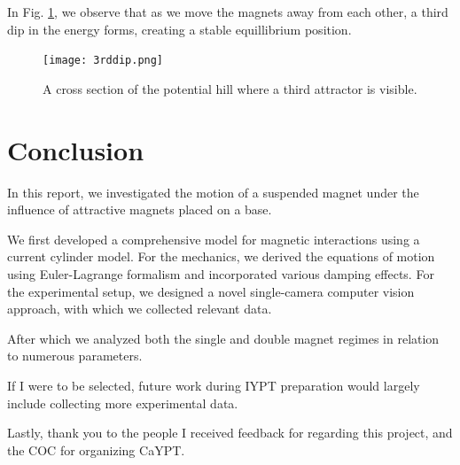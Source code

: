 \documentclass[prl,twocolumn,amsmath,amssymb,superscriptaddress]{revtex4-2}
\begin{document}
\newpage
In Fig. \ref{fig:3rddip}, we observe that as we move the magnets away from each other, a third dip in the energy forms, creating a stable equillibrium position.

\begin{figure}[htb]
    \centering
    \texttt{[image: 3rddip.png]}
    \caption{A cross section of the potential hill where a third attractor is visible.}
    \label{fig:3rddip}
\end{figure}

\section{Conclusion}
In this report, we investigated the motion of a suspended magnet under the influence of attractive magnets placed on a base.

We first developed a comprehensive model for magnetic interactions using a current cylinder model. For the mechanics, we derived the equations of motion using Euler-Lagrange formalism and incorporated various damping effects. For the experimental setup, we designed a novel single-camera computer vision approach, with which we collected relevant data.

After which we analyzed both the single and double magnet regimes in relation to numerous parameters.

If I were to be selected, future work during IYPT preparation would largely include collecting more experimental data.

Lastly, thank you to the people I received feedback for regarding this project, and the COC for organizing CaYPT.

{}

\end{document}
